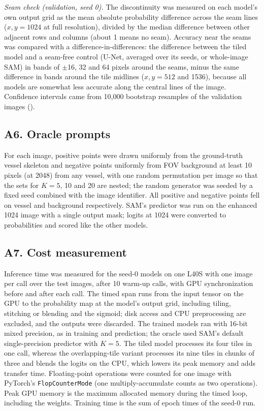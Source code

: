 \emph{Seam check (validation, seed 0).} The discontinuity was measured on each model's own output grid as the mean absolute
probability difference across the seam lines ($x, y = 1024$ at full resolution), divided by the median difference between
other adjacent rows and columns (about 1 means no seam). Accuracy near the seams was compared with a difference-in-differences:
the difference between the tiled model and a seam-free control (U-Net, averaged over its seeds, or whole-image SAM) in bands
of $\pm$16, 32 and 64 pixels around the seams, minus the same difference in bands around the tile midlines ($x, y = 512$
and 1536), because all models are somewhat less accurate along the central lines of the image. Confidence intervals came
from 10,000 bootstrap resamples of the \NVal{} validation images ().

\subsection*{A6. Oracle prompts}
For each image, positive points were drawn uniformly from the ground-truth vessel skeleton and negative points uniformly
from FOV background at least 10 pixels (at 2048) from any vessel, with one random permutation per image so that the sets
for $K = 5$, 10 and 20 are nested; the random generator was seeded by a fixed seed combined with the image identifier. All positive and negative
points fell on vessel and background respectively. SAM's predictor was run on the enhanced 1024 image with a single
output mask; logits at 1024 were converted to probabilities and scored like the other models.

\subsection*{A7. Cost measurement}
Inference time was measured for the seed-0 models on one L40S with one image per call over the \NTestImages{} test images,
after 10 warm-up calls, with GPU synchronization before and after each call. The timed span runs from the input tensor on
the GPU to the probability map at the model's output grid, including tiling, stitching or blending and the sigmoid; disk
access and CPU preprocessing are excluded, and the outputs were discarded. The trained models ran with 16-bit mixed
precision, as in training and prediction; the oracle used SAM's default single-precision predictor with $K = 5$. The tiled
model processes its four tiles in one call, whereas the overlapping-tile variant processes its nine tiles in chunks of
three and blends the logits on the CPU, which lowers its peak memory and adds transfer time. Floating-point operations were counted for one
image with PyTorch's \texttt{FlopCounterMode} (one multiply-accumulate counts as two operations). Peak GPU memory is the
maximum allocated memory during the timed loop, including the weights. Training time is the sum of epoch times of the
seed-0 run.

